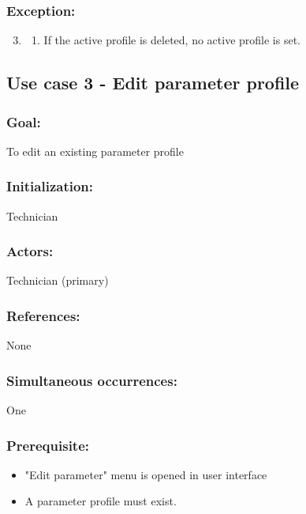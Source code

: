 \begin{framed}
	\subsubsection*{Exception:}
	\begin{enumerate}
		\setcounter{enumi}{2}
		\item 
		\begin{enumerate}
			\item If the active profile is deleted, no active profile is set.
		\end{enumerate}
	\end{enumerate}


\end{framed}



\begin{framed}
\subsection{Use case 3 - Edit parameter profile}
\subsubsection*{Goal:}
To edit an existing parameter profile 

\subsubsection*{Initialization:}
Technician

\subsubsection*{Actors:}
Technician (primary)

\subsubsection*{References:}
None

\subsubsection*{Simultaneous occurrences:}
One

\subsubsection*{Prerequisite:}
\begin{itemize}
	\item "Edit parameter" menu is opened in user interface
	\item A parameter profile must exist.
\end{itemize}



\end{framed}
